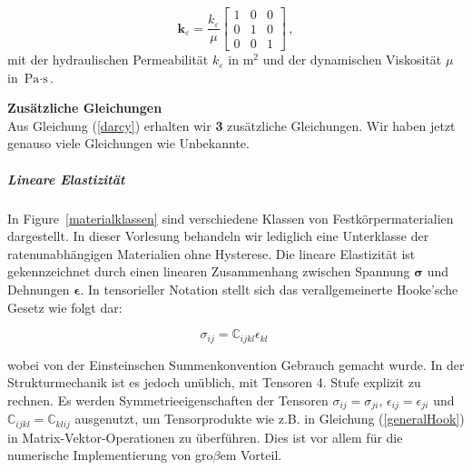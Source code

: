 \begin{equation}
 \bm{k}_{\varepsilon} = \frac{k_{\varepsilon}}{\mu} \begin{bmatrix} 1 & 0 & 0 \\ 0 & 1 & 0 \\ 0 & 0 & 1\end{bmatrix}  \, ,
\end{equation}
mit der hydraulischen Permeabilität $k_{\varepsilon}$ in $\text{m}^2$ und der dynamischen Viskosität $\mu$ in $\text{Pa}\cdot \text{s}$.

\begin{framed}
\textbf{Zusätzliche Gleichungen}\\
Aus Gleichung (\ref{darcy}) erhalten wir \textbf{3} zusätzliche Gleichungen. Wir haben jetzt genauso viele Gleichungen wie Unbekannte.
\end{framed}


\subparagraph{Lineare Elastizität}

In Figure~\ref{materialklassen} sind verschiedene Klassen von Festkörpermaterialien dargestellt. In dieser Vorlesung behandeln wir lediglich eine Unterklasse der ratenunabhängigen Materialien ohne Hysterese. Die lineare Elastizität ist gekennzeichnet durch einen linearen Zusammenhang zwischen Spannung $\bm{\sigma}$ und Dehnungen $\bm{\epsilon}$. In tensorieller Notation stellt sich das verallgemeinerte Hooke'sche Gesetz wie folgt dar:

\begin{equation}
\label{generalHook}
\sigma_{ij} = \mathbb{C}_{ijkl} \epsilon_{kl} \;
\end{equation}

wobei von der Einsteinschen Summenkonvention Gebrauch gemacht wurde. In der Strukturmechanik ist es jedoch unüblich, mit Tensoren 4. Stufe explizit zu rechnen. Es werden Symmetrieeigenschaften der Tensoren $\sigma_{ij}=\sigma_{ji}$, $\epsilon_{ij}=\epsilon_{ji}$ und $\mathbb{C}_{ijkl}=\mathbb{C}_{klij}$ ausgenutzt, um Tensorprodukte wie z.B. in Gleichung (\ref{generalHook}) in Matrix-Vektor-Operationen zu überführen. Dies ist vor allem für die numerische Implementierung von gro$\beta$em Vorteil.

